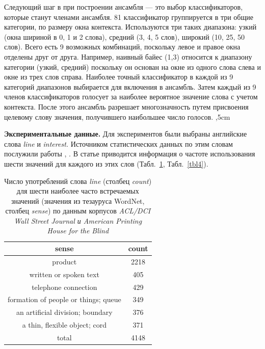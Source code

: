 \documentclass{article}
\begin{document}
\begin{articletext}
Следующий шаг в \cite{Pedersen 2000} при построении ансамбля --- это выбор классификаторов, которые станут членами ансамбля. 81 классификатор группируется в три общие категории, по размеру окна контекста. Используются три таких диапазона: узкий (окна шириной в 0, 1 и 2 слова), средний (3, 4, 5 слов), широкий (10, 25, 50 слов). Всего есть 9 возможных комбинаций, поскольку левое и правое окна отделены друг от друга. Например, наивный байес (1,3) относится к диапазону категории (узкий, средний) поскольку он основан на окне из одного слова слева и окне из трех слов справа.  Наиболее точный классификатор в каждой из 9 категорий диапазонов выбирается для включения в ансамбль. Затем каждый из 9 членов классификаторов голосует за наиболее вероятное значение слова с учетом контекста. После этого ансамбль разрешает многозначность путем присвоения целевому слову значения, получившего наибольшее число голосов. 
,5cm

\textbf{Экспериментальные данные.} Для экспериментов были выбраны английские слова \textit{line} и \textit{interest.} Источником статистических данных по этим словам послужили работы \cite{Leacock 1993}, \cite{Bruce 1994}. В статье приводится информация о частоте использования шести значений для каждого из этих слов (Табл.~\ref{tbl3}, Табл.~\ref{tbl4}). 

\begin{table}[H]
\centering
\caption{Число употреблений слова \textit{line} (столбец \textit{count}) для шести наиболее часто встречаемых значений (значения из те\-за\-уру\-са WordNet, столбец \textit{sense}) по данным корпусов \textit{ACL/DCI Wall Street Journal и American Printing House for the Blind}}
\begin{tabular}{|c|c|}
\hline
sense & count\\
\hline
product & 2218\\
written or spoken text & 405\\
telephone connection & 429\\
formation of people or things; queue & 349\\
an artificial division; boundary & 376\\
a thin, flexible object; cord & 371\\
\hline
total & 4148\\
\hline
\end{tabular}
\label{tbl3}
\end{table}


\end{articletext}
\end{document}
